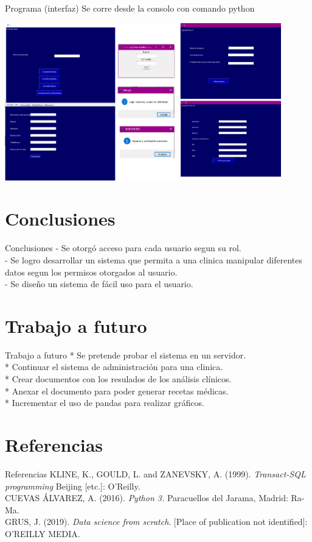 \documentclass[10pt]{beamer}
\begin{document}
\begin{frame}{Programa (interfaz)}
Se corre desde la consolo con comando python

\centering
\includegraphics[width=12cm]{ventas.png}
 
\end{frame}

\section{Conclusiones}
\begin{frame}{Conclusiones}
- Se otorgó acceso  para cada usuario segun su rol. \\
- Se logro desarrollar un sistema que permita a una clinica manipular diferentes datos segun los permisos otorgados al usuario. \\
- Se diseño un sistema de fácil uso para el usuario. \\
\end{frame}

\section{Trabajo a futuro}
\begin{frame}{Trabajo a futuro}
* Se pretende probar el sistema en un servidor. \\
* Continuar el sistema de administración para una clinica. \\
* Crear documentos con los resulados de los análisis clínicos. \\
* Anexar el documento para poder generar recetas médicas. \\
* Incrementar el uso de pandas para realizar gráficos. \\
\end{frame}

\section{Referencias}
\begin{frame}{Referencias}
KLINE, K., GOULD, L. and ZANEVSKY, A. (1999). \textit{Transact-SQL programming} Beijing [etc.]: O'Reilly. \\
[2] CUEVAS ÁLVAREZ, A. (2016). \textit{ Python 3.} Paracuellos del Jarama, Madrid: Ra-Ma.\\
[3] GRUS, J. (2019). \textit{Data science from scratch}. [Place of publication not identified]: O'REILLY MEDIA.
\end{frame}
\end{document}
